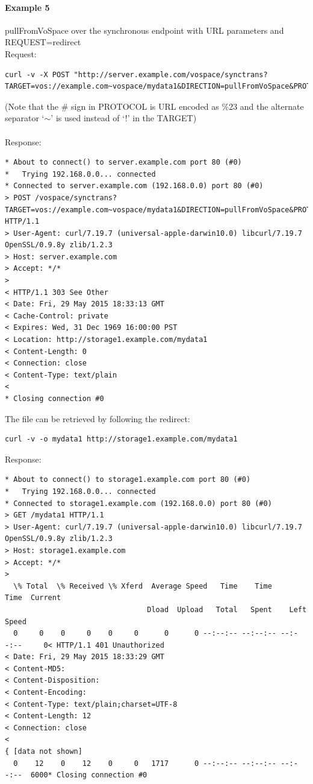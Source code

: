 \documentclass[11pt,a4paper]{ivoa}
\begin{document}
\paragraph{Example 5}
pullFromVoSpace over the synchronous endpoint with URL parameters and REQUEST=redirect
\\[5px]
\noindent
Request:
\begin{lstlisting}
curl -v -X POST "http://server.example.com/vospace/synctrans?TARGET=vos://example.com~vospace/mydata1&DIRECTION=pullFromVoSpace&PROTOCOL=ivo://ivoa.net/vospace/core%23httpget&REQUEST=redirect"
\end{lstlisting}
(Note that the \# sign in PROTOCOL is URL encoded as \%23 and the alternate separator `$\mathtt{\sim}$' is used instead of `!' in the TARGET) \\
\\
Response:
\begin{lstlisting}
* About to connect() to server.example.com port 80 (#0)
*   Trying 192.168.0.0... connected
* Connected to server.example.com (192.168.0.0) port 80 (#0)
> POST /vospace/synctrans?TARGET=vos://example.com~vospace/mydata1&DIRECTION=pullFromVoSpace&PROTOCOL=ivo://ivoa.net/vospace/core\%23httpget&REQUEST=redirect HTTP/1.1
> User-Agent: curl/7.19.7 (universal-apple-darwin10.0) libcurl/7.19.7 OpenSSL/0.9.8y zlib/1.2.3
> Host: server.example.com
> Accept: */*
>
< HTTP/1.1 303 See Other
< Date: Fri, 29 May 2015 18:33:13 GMT
< Cache-Control: private
< Expires: Wed, 31 Dec 1969 16:00:00 PST
< Location: http://storage1.example.com/mydata1
< Content-Length: 0
< Connection: close
< Content-Type: text/plain
<
* Closing connection #0
\end{lstlisting}
The file can be retrieved by following the redirect:
\begin{lstlisting}
curl -v -o mydata1 http://storage1.example.com/mydata1
\end{lstlisting}
Response:
\begin{lstlisting}
* About to connect() to storage1.example.com port 80 (#0)
*   Trying 192.168.0.0... connected
* Connected to storage1.example.com (192.168.0.0) port 80 (#0)
> GET /mydata1 HTTP/1.1
> User-Agent: curl/7.19.7 (universal-apple-darwin10.0) libcurl/7.19.7 OpenSSL/0.9.8y zlib/1.2.3
> Host: storage1.example.com
> Accept: */*
>
  \% Total  \% Received \% Xferd  Average Speed   Time    Time     Time  Current
                                 Dload  Upload   Total   Spent    Left  Speed
  0     0    0     0    0     0      0      0 --:--:-- --:--:-- --:--:--     0< HTTP/1.1 401 Unauthorized
< Date: Fri, 29 May 2015 18:33:29 GMT
< Content-MD5:
< Content-Disposition:
< Content-Encoding:
< Content-Type: text/plain;charset=UTF-8
< Content-Length: 12
< Connection: close
<
{ [data not shown]
  0    12    0    12    0     0   1717      0 --:--:-- --:--:-- --:--:--  6000* Closing connection #0
\end{lstlisting}
\end{document}
